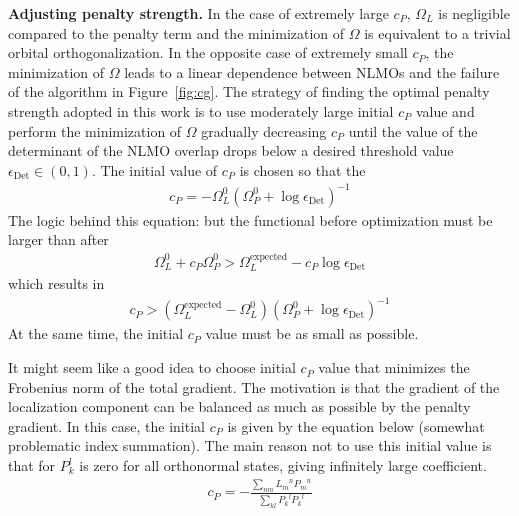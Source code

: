 \documentclass[aps,prl,reprint,amsmath,amssymb]{revtex4-1}
\begin{document}
\textbf{Adjusting penalty strength.} In the case of extremely large $c_P$, $\Omega_L$ is negligible compared to the penalty term and the minimization of $\Omega$ is equivalent to a trivial orbital orthogonalization. In the opposite case of extremely small $c_P$, the minimization of $\Omega$ leads to a linear dependence between NLMOs and the failure of the algorithm in Figure~\ref{fig:cg}. %
The strategy of finding the optimal penalty strength adopted in this work is to use moderately large initial $c_P$ value and perform the minimization of $\Omega$ gradually decreasing $c_P$ until the value of the determinant of the NLMO overlap drops below a desired threshold value $\epsilon_{\text{Det}} \in (0,1)$. The initial value of $c_P$ is chosen so that the 
%
\begin{equation}
\begin{split}
c_{P} = - \Omega^0_{L}(\Omega^0_P + \log \epsilon_{\text{Det}})^{-1}  
\end{split}
\end{equation}
%
The logic behind this equation: but the functional before optimization must be larger than after 
%
\begin{equation}
\begin{split}
\Omega^0_{L} + c_P \Omega^0_P > \Omega^{\text{expected}}_L - c_P \log \epsilon_{\text{Det}} 
\end{split}
\end{equation}
%
which results in
%
\begin{equation}
\begin{split}
c_P > (\Omega^{\text{expected}}_L - \Omega^0_{L}) (\Omega^0_P + \log \epsilon_{\text{Det}})^{-1}
\end{split}
\end{equation}
%
At the same time, the initial $c_P$ value must be as small as possible.

{\color{red} It might seem like a good idea to choose initial $c_P$ value that minimizes the Frobenius norm of the total gradient. The motivation is that the gradient of the localization component can be balanced as much as possible by the penalty gradient. In this case, the initial $c_P$ is given by the equation below (somewhat problematic index summation). The main reason not to use this initial value is that for $P_k^l$ is zero for all orthonormal states, giving infinitely large coefficient.
%
\begin{equation}
\begin{split}
c_P = - \frac{ \sum_{nm} {L_m}^n {P_m}^n}{ \sum_{kl} {P_k}^l {P_k}^l}  
\end{split}
\end{equation}
%
}
\end{document}
